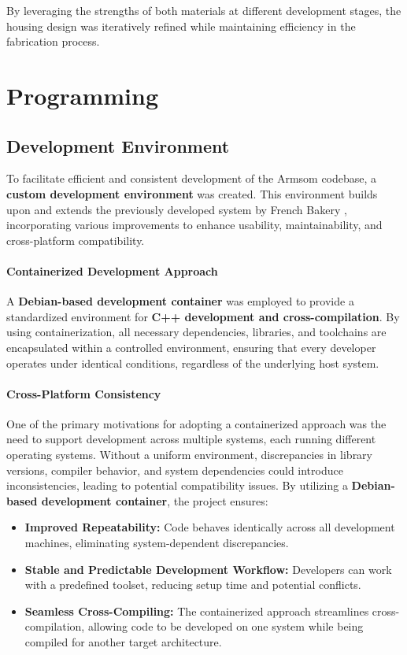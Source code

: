 By leveraging the strengths of both materials at different development stages, the housing design was iteratively refined while maintaining efficiency in the fabrication process.


\section{Programming}
\subsection{Development Environment}  

To facilitate efficient and consistent development of the Armsom codebase, a \textbf{custom development environment} was created. This environment builds upon and extends the previously developed system by French Bakery \cite{fb_dev_environment}, incorporating various improvements to enhance usability, maintainability, and cross-platform compatibility.  

\paragraph{Containerized Development Approach}  
A \textbf{Debian-based development container} was employed to provide a standardized environment for \textbf{C++ development and cross-compilation}. By using containerization, all necessary dependencies, libraries, and toolchains are encapsulated within a controlled environment, ensuring that every developer operates under identical conditions, regardless of the underlying host system.  

\paragraph{Cross-Platform Consistency}  
One of the primary motivations for adopting a containerized approach was the need to support development across multiple systems, each running different operating systems. Without a uniform environment, discrepancies in library versions, compiler behavior, and system dependencies could introduce inconsistencies, leading to potential compatibility issues. By utilizing a \textbf{Debian-based development container}, the project ensures:  
\begin{itemize}  
	\item \textbf{Improved Repeatability:} Code behaves identically across all development machines, eliminating system-dependent discrepancies.  
	\item \textbf{Stable and Predictable Development Workflow:} Developers can work with a predefined toolset, reducing setup time and potential conflicts.  
	\item \textbf{Seamless Cross-Compiling:} The containerized approach streamlines cross-compilation, allowing code to be developed on one system while being compiled for another target architecture.  
\end{itemize}  


